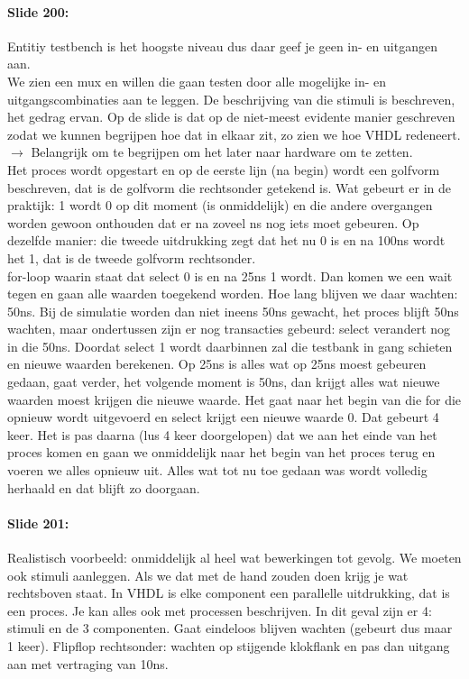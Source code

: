 \documentclass[10pt,a4paper]{book}
\begin{document}
\paragraph{Slide 200:} Entitiy testbench is het hoogste niveau dus daar geef je geen in- en uitgangen aan.\\
We zien een mux en willen die gaan testen door alle mogelijke in- en uitgangscombinaties aan te leggen. De beschrijving van die stimuli is beschreven, het gedrag ervan. Op de slide is dat op de niet-meest evidente manier geschreven zodat we kunnen begrijpen hoe dat in elkaar zit, zo zien we hoe VHDL redeneert. $\rightarrow$ Belangrijk om te begrijpen om het later naar hardware om te zetten.\\
Het proces wordt opgestart en op de eerste lijn (na begin) wordt een golfvorm beschreven, dat is de golfvorm die rechtsonder getekend is. Wat gebeurt er in de praktijk: 1 wordt 0 op dit moment (is onmiddelijk) en die andere overgangen worden gewoon onthouden dat er na zoveel ns nog iets moet gebeuren. Op dezelfde manier: die tweede uitdrukking zegt dat het nu 0 is en na 100ns wordt het 1, dat is de tweede golfvorm rechtsonder.\\
for-loop waarin staat dat select 0 is en na 25ns 1 wordt. Dan komen we een wait tegen en gaan alle waarden toegekend worden. Hoe lang blijven we daar wachten: 50ns. Bij de simulatie worden dan niet ineens 50ns gewacht, het proces blijft 50ns wachten, maar ondertussen zijn er nog transacties gebeurd: select verandert nog in die 50ns. Doordat select 1 wordt daarbinnen zal die testbank in gang schieten en nieuwe waarden berekenen. Op 25ns is alles wat op 25ns moest gebeuren gedaan, gaat verder, het volgende moment is 50ns, dan krijgt alles wat nieuwe waarden moest krijgen die nieuwe waarde. Het gaat naar het begin van die for die opnieuw wordt uitgevoerd en select krijgt een nieuwe waarde 0. Dat gebeurt 4 keer. Het is pas daarna (lus 4 keer doorgelopen) dat we aan het einde van het proces komen en gaan we onmiddelijk naar het begin van het proces terug en voeren we alles opnieuw uit. Alles wat tot nu toe gedaan was wordt volledig herhaald en dat blijft zo doorgaan.

\paragraph{Slide 201:} Realistisch voorbeeld: onmiddelijk al heel wat bewerkingen tot gevolg. We moeten ook stimuli aanleggen. Als we dat met de hand zouden doen krijg je wat rechtsboven staat. In VHDL is elke component een parallelle uitdrukking, dat is een proces. Je kan alles ook met processen beschrijven. In dit geval zijn er 4: stimuli en de 3 componenten. Gaat eindeloos blijven wachten (gebeurt dus maar 1 keer). Flipflop rechtsonder: wachten op stijgende klokflank en pas dan uitgang aan met vertraging van 10ns.
\end{document}
